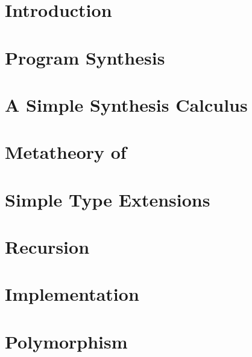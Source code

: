 \chapter{Introduction}
\label{ch:introduction}


\chapter{Program Synthesis}
\label{ch:program-synthesis}


\chapter{A Simple Synthesis Calculus}
\label{ch:a-simple-synthesis-calculus}


\chapter{Metatheory of \texorpdfstring{\lsyn{}}{λsyn}}
\label{ch:metatheory-of-lsyn}


\chapter{Simple Type Extensions}
\label{ch:simple-type-extensions}


\chapter{Recursion}
\label{ch:recursion}


\chapter{Implementation}
\label{ch:implementation}


\chapter{Polymorphism}
\label{ch:polymorphism}


%

